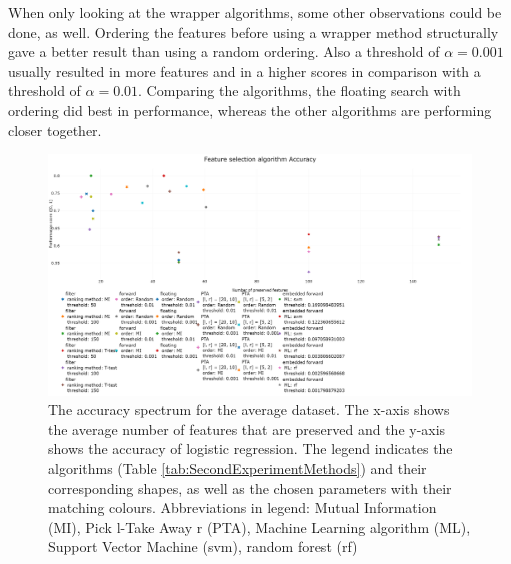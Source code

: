 \documentclass[10pt,a4paper]{article}
\begin{document}
	When only looking at the wrapper algorithms, some other observations could be done, as well. Ordering the features before using a wrapper method structurally gave a better result than using a random ordering. Also a threshold of $\alpha = 0.001$ usually resulted in more features and in a higher scores in comparison with a threshold of $\alpha = 0.01$. Comparing the algorithms, the floating search with ordering did best in performance, whereas the other algorithms are performing closer together.
	
	\begin{figure}[H]
		\centering
		\includegraphics[angle=90,height=1.4\textwidth]{Accuracy_new.png}
		\caption{The accuracy spectrum for the average dataset. The x-axis shows the average number of features that are preserved and the y-axis shows the accuracy of logistic regression. The legend indicates the algorithms (Table \ref{tab:SecondExperimentMethods}) and their corresponding shapes, as well as the chosen parameters with their matching colours. Abbreviations in legend: Mutual Information (MI), Pick l-Take Away r (PTA), Machine Learning algorithm (ML), Support Vector Machine (svm), random forest (rf)}
		\label{fig:Avg_Accuracy_Spectrum}
	\end{figure}
\end{document}
